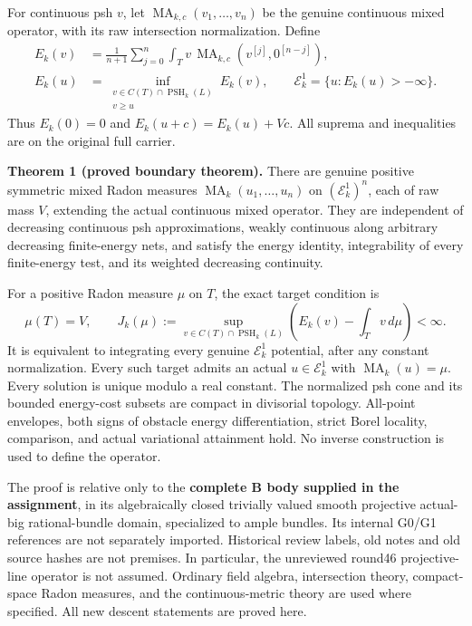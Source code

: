 \documentclass[
  11pt,
]{article}
\begin{document}
For continuous psh \(v\), let
\(\operatorname{MA}_{k,c}(v_1,\ldots,v_n)\) be the genuine continuous
mixed operator, with its raw intersection normalization. Define \[
 \begin{aligned}
 E_k(v)&=\frac1{n+1}\sum_{j=0}^n
 \int_T v\,\operatorname{MA}_{k,c}(v^{[j]},0^{[n-j]}),\\
 E_k(u)&=\inf_{\substack{v\in C(T)\cap\operatorname{PSH}_k(L)\\v\geq u}}E_k(v),
 \qquad\mathcal E^1_k=\{u:E_k(u)>-\infty\}.
 \end{aligned}
 \tag{2}
\] Thus \(E_k(0)=0\) and \(E_k(u+c)=E_k(u)+Vc\). All suprema and
inequalities are on the original full carrier.

\textbf{Theorem 1 (proved boundary theorem).} There are genuine positive
symmetric mixed Radon measures \(\operatorname{MA}_k(u_1,\ldots,u_n)\)
on \((\mathcal E^1_k)^n\), each of raw mass \(V\), extending the actual
continuous mixed operator. They are independent of decreasing continuous
psh approximations, weakly continuous along arbitrary decreasing
finite-energy nets, and satisfy the energy identity, integrability of
every finite-energy test, and its weighted decreasing continuity.

For a positive Radon measure \(\mu\) on \(T\), the exact target
condition is \[
 \mu(T)=V,\qquad
 J_k(\mu):=\sup_{v\in C(T)\cap\operatorname{PSH}_k(L)}
       \left(E_k(v)-\int_T v\,d\mu\right)<\infty.
 \tag{3}
\] It is equivalent to integrating every genuine \(\mathcal E^1_k\)
potential, after any constant normalization. Every such target admits an
actual \(u\in\mathcal E^1_k\) with \(\operatorname{MA}_k(u)=\mu\). Every
solution is unique modulo a real constant. The normalized psh cone and
its bounded energy-cost subsets are compact in divisorial topology.
All-point envelopes, both signs of obstacle energy differentiation,
strict Borel locality, comparison, and actual variational attainment
hold. No inverse construction is used to define the operator.

The proof is relative only to the \textbf{complete B body supplied in
the assignment}, in its algebraically closed trivially valued smooth
projective actual-big rational-bundle domain, specialized to ample
bundles. Its internal G0/G1 references are not separately imported.
Historical review labels, old notes and old source hashes are not
premises. In particular, the unreviewed round46 projective-line operator
is not assumed. Ordinary field algebra, intersection theory,
compact-space Radon measures, and the continuous-metric theory are used
where specified. All new descent statements are proved here.
\end{document}
